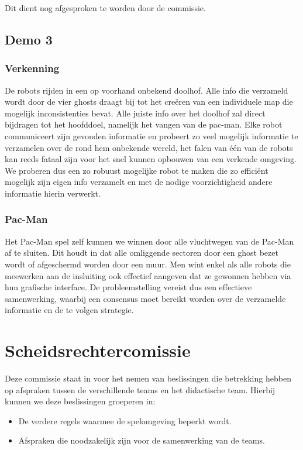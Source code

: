 \documentclass[12pt,a4paper]{report}
\begin{document}
Dit dient nog afgesproken te worden door de commissie.

\section{Demo 3}

\subsection{Verkenning}

De robots rijden in een op voorhand onbekend doolhof. Alle info die verzameld wordt door de vier ghosts draagt bij tot het cre\"eren van een individuele map die mogelijk inconsistenties bevat. Alle juiste info over het doolhof zal direct bijdragen tot het hoofddoel, namelijk het vangen van de pac-man. Elke robot communiceert zijn gevonden informatie en probeert zo veel mogelijk informatie te verzamelen over de rond hem onbekende wereld, het falen van \'e\'en van de robots kan reeds fataal zijn voor het snel kunnen opbouwen van een verkende omgeving. We proberen dus een zo robuust mogelijke robot te maken die zo effici\"ent mogelijk zijn eigen info verzamelt en met de nodige voorzichtigheid andere informatie hierin verwerkt.

\subsection{Pac-Man}

Het Pac-Man spel zelf kunnen we winnen door alle vluchtwegen van de Pac-Man af te sluiten. Dit houdt in dat alle omliggende sectoren door een ghost bezet wordt of afgeschermd worden door een muur. Men wint enkel als alle robots die meewerken aan de insluiting ook effectief aangeven dat ze gewonnen hebben via hun grafische interface. De probleemstelling vereist dus een effectieve samenwerking, waarbij een consensus moet bereikt worden over de verzamelde informatie en de te volgen strategie.

\chapter{Scheidsrechtercomissie}

Deze commissie staat in voor het nemen van beslissingen die betrekking hebben op afspraken tussen de verschillende teams en het didactische team. Hierbij kunnen we deze beslissingen groeperen in:
\begin{itemize}
	\item De verdere regels waarmee de spelomgeving beperkt wordt.
	\item Afspraken die noodzakelijk zijn voor de samenwerking van de teams.
\end{itemize}
\end{document}
